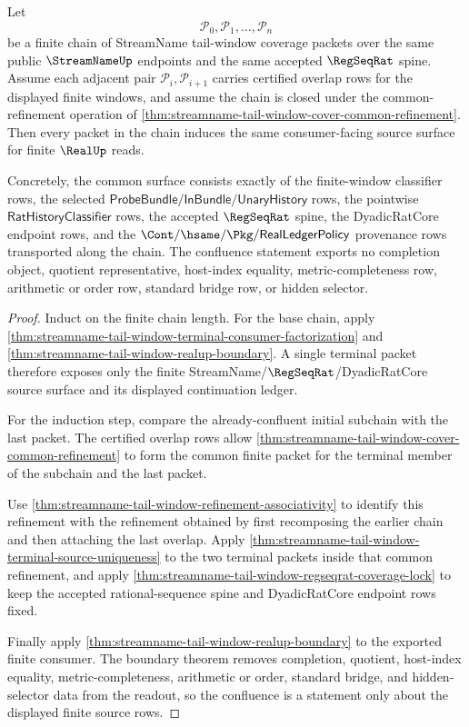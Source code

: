 \begin{theorem}
\label{thm:streamname-tail-window-cover-chain-source-confluence}
Let
$$
\mathcal P_0,\mathcal P_1,\ldots,\mathcal P_n
$$
be a finite chain of StreamName tail-window coverage packets over the same
public $\StreamNameUp$ endpoints and the same accepted $\RegSeqRat$ spine.
Assume each adjacent pair $\mathcal P_i,\mathcal P_{i+1}$ carries certified
overlap rows for the displayed finite windows, and assume the chain is closed
under the common-refinement operation of
\autoref{thm:streamname-tail-window-cover-common-refinement}. Then every packet
in the chain induces the same consumer-facing source surface for finite
$\RealUp$ reads.

Concretely, the common surface consists exactly of the finite-window classifier
rows, the selected $\mathsf{ProbeBundle}/\mathsf{InBundle}/\mathsf{UnaryHistory}$
rows, the pointwise $\mathsf{RatHistoryClassifier}$ rows, the accepted
$\RegSeqRat$ spine, the DyadicRatCore endpoint rows, and the
$\Cont/\hsame/\Pkg/\mathsf{RealLedgerPolicy}$ provenance rows transported along
the chain. The confluence statement exports no completion object, quotient
representative, host-index equality, metric-completeness row, arithmetic or
order row, standard bridge row, or hidden selector.
\end{theorem}
\begin{proof}
Induct on the finite chain length. For the base chain, apply
\autoref{thm:streamname-tail-window-terminal-consumer-factorization} and
\autoref{thm:streamname-tail-window-realup-boundary}. A single terminal packet
therefore exposes only the finite StreamName/$\RegSeqRat$/DyadicRatCore source
surface and its displayed continuation ledger.

For the induction step, compare the already-confluent initial subchain with the
last packet. The certified overlap rows allow
\autoref{thm:streamname-tail-window-cover-common-refinement} to form the common
finite packet for the terminal member of the subchain and the last packet.

Use \autoref{thm:streamname-tail-window-refinement-associativity} to identify
this refinement with the refinement obtained by first recomposing the earlier
chain and then attaching the last overlap. Apply
\autoref{thm:streamname-tail-window-terminal-source-uniqueness} to the two
terminal packets inside that common refinement, and apply
\autoref{thm:streamname-tail-window-regseqrat-coverage-lock} to keep the
accepted rational-sequence spine and DyadicRatCore endpoint rows fixed.

Finally apply \autoref{thm:streamname-tail-window-realup-boundary} to the
exported finite consumer. The boundary theorem removes completion, quotient,
host-index equality, metric-completeness, arithmetic or order, standard bridge,
and hidden-selector data from the readout, so the confluence is a statement
only about the displayed finite source rows.
\end{proof}


